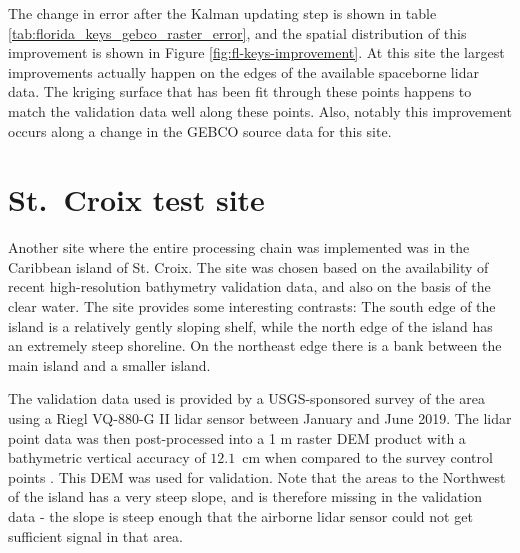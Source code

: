 The change in error after the Kalman updating step is shown in table \ref{tab:florida_keys_gebco_raster_error}, and the spatial distribution of this improvement is shown in Figure \ref{fig:fl-keys-improvement}. At this site the largest improvements actually happen on the edges of the available spaceborne lidar data. The kriging surface that has been fit through these points happens to match the validation data well along these points. Also, notably this improvement occurs along a change in the GEBCO source data for this site.

\begin{figure}[!ht]
    \begin{floatrow}
    \end{floatrow}
\end{figure}

\section{St.~Croix test site} \label{sec:stcroix-site}

Another site where the entire processing chain was implemented was in the Caribbean island of St. Croix. The site was chosen based on the availability of recent high-resolution bathymetry validation data, and also on the basis of the clear water. The site provides some interesting contrasts: The south edge of the island is a relatively gently sloping shelf, while the north edge of the island has an extremely steep shoreline. On the northeast edge there is a bank between the main island and a smaller island.

The validation data used is provided by a USGS-sponsored survey of the area using a Riegl VQ-880-G II lidar sensor between January and June 2019. The lidar point data was then post-processed into a 1 m raster DEM product with a bathymetric vertical accuracy of $12.1$~cm when compared to the survey control points \parencite{USVI-lidar2022}. This DEM was used for validation. Note that the areas to the Northwest of the island has a very steep slope, and is therefore missing in the validation data - the slope is steep enough that the airborne lidar sensor could not get sufficient signal in that area.

